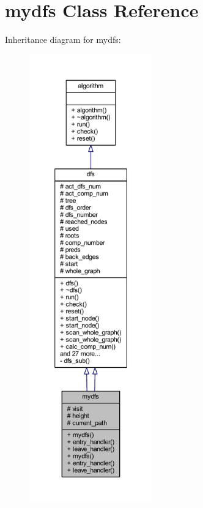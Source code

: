 \hypertarget{classmydfs}{}\section{mydfs Class Reference}
\label{classmydfs}


Inheritance diagram for mydfs\+:\nopagebreak
\begin{figure}[H]
\begin{center}
\leavevmode
\includegraphics[height=550pt]{classmydfs__inherit__graph}
\end{center}
\end{figure}


